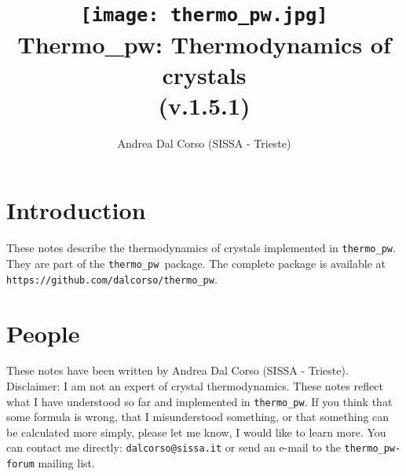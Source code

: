 \documentclass[12pt,a4paper]{article}
\def\version{1.5.1}
\def\tpw{\texttt{thermo\_pw}}
\begin{document}
 

\author{Andrea Dal Corso (SISSA - Trieste)}
\date{}

\title{
  \texttt{[image: thermo\_pw.jpg]} \\
  \vspace{3truecm}
  \Huge \color{blue} Thermo\_pw: Thermodynamics of crystals \\(v.\version)
}

\maketitle

\newpage

\tableofcontents

\newpage

\section{{\color{coral}Introduction}}
These notes describe the thermodynamics of crystals implemented in \tpw. \\
They are part of the \tpw\ package. The complete package is
available at \texttt{https://github.com/dalcorso/thermo\_pw}.

\newpage
\section{\color{coral}People}
These notes have been written by Andrea Dal Corso (SISSA - Trieste). \\
Disclaimer: I am not an expert of crystal thermodynamics. 
These notes reflect what I have understood so far and implemented in 
\texttt{thermo\_pw}. If you think that some formula is wrong, 
that I misunderstood something, or that something can be calculated more 
simply, please let me know, I would like to learn more. 
You can contact me directly: \texttt{dalcorso@sissa.it} or send an
e-mail to the \texttt{thermo\_pw-forum} mailing list.

\newpage
\end{document}
